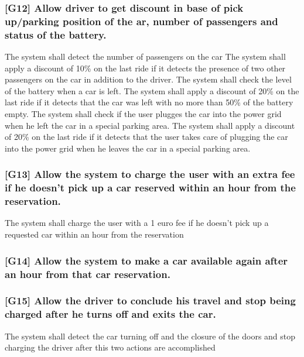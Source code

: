 \subsubsection{{[}G12{]} Allow driver to get discount in base of pick up/parking
	position of the ar, number of passengers and status of the battery.}
\begin{itemize}
	\reqcounter The system shall detect the number of passengers on the car
	\reqcounter The system shall apply a discount of 10\% on the last ride if it detects the presence of two other passengers on the car in addition to the driver.
	\reqcounter The system shall check the level of the battery when a car is left.
	\reqcounter The system shall apply a discount 	of 20\% on the last ride if it detects that the car was left with no more than 50\% of the battery empty.
	\reqcounter The system shall check if the user plugges the car into the power grid when he left the car in a special parking area.
	\reqcounter The system shall apply a discount 	of 20\% on the last ride if it detects that the user takes care of plugging the car into the power grid when he leaves the car in a special parking area. 
\end{itemize}

\subsubsection{{[}G13{]} Allow the system to charge the user with an extra fee if he doesn't
	pick up a car reserved within an hour from the reservation.}

\begin{itemize}
	\reqcounter The system shall charge the user with a 1 euro fee if he doesn't pick up a requested car within an hour from the reservation
	
\end{itemize}

\subsubsection{{[}G14{]} Allow the system to make a car available again after an hour from that car reservation.}


\subsubsection{{[}G15{]} Allow the driver to conclude his travel and stop being charged after he turns off and exits the car.}
\begin{itemize}
	\reqcounter The system shall detect the car turning off and the closure of the doors and stop charging the driver after this two actions are accomplished
	
\end{itemize}


